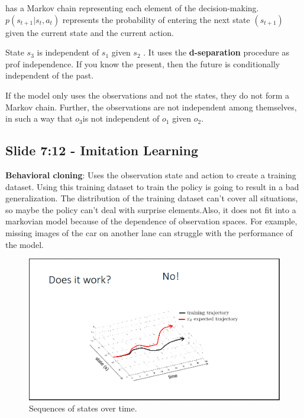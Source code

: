 \documentclass[]{article}
\begin{document}
 has a Markov chain representing each element of the decision-making. $p(s_{t+1}|s_{t},a_{t})$
represents the probability of entering the next state $(s_{t + 1}) $ given the current state and the current
action.

\par  State $s_{3}$ is independent of $s_{1}$ given $s_{2}$ . It uses the \textbf{d-separation} procedure as prof
independence. If you know
the present, then the future is conditionally independent of the past. 
\par If the model only uses the observations and not the states, they do not form a Markov chain. Further,
the observations are not independent among themselves, in such a way that $o_{3} $is not independent of $o_{1} $ given
$o_{2}$.


\subsection*{Slide  7:12 - Imitation Learning}%
\label{sub:Slide 7}

\par \textbf{Behavioral cloning}: Uses the observation state and action to create a training dataset. Using this
training dataset to train the policy is going to result in a bad generalization. 
 The distribution of the training dataset can't cover all situations, so maybe the policy can't deal with
 surprise elements.Also, it does not fit into a markovian model because of the dependence of observation spaces. For
 example, missing images of the car on another lane can struggle with the performance of the model.

\begin{figure}
\begin{center}
    \includegraphics[scale=0.4]{cap2img/slide8.png}
\end{center}
\caption{Sequences of states over time.}
\label{fig:trajectory}
\end{figure}
\end{document}
